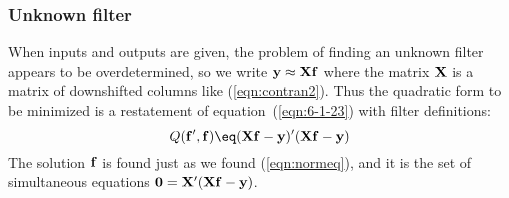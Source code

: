 \subsubsection{Unknown filter}
When inputs and outputs are given,
the problem of finding an unknown filter appears to be overdetermined,
so we write $\bold y \approx \bold X \bold f$
where the matrix $\bold X$ is a matrix of downshifted columns like
(\ref{eqn:contran2}).
Thus the quadratic form to be minimized
is a restatement of equation~(\ref{eqn:6-1-23})
with filter definitions:
\begin{equation}
Q(\bold f', \bold f) \eq
(\bold X\bold f - \bold y)'
(\bold X\bold f - \bold y)
\end{equation}
The solution $\bold f$ is found just as we found
(\ref{eqn:normeq}),
and it is the set of simultaneous equations
$ \bold 0 = \bold X'(\bold X\bold f - \bold y)$.

